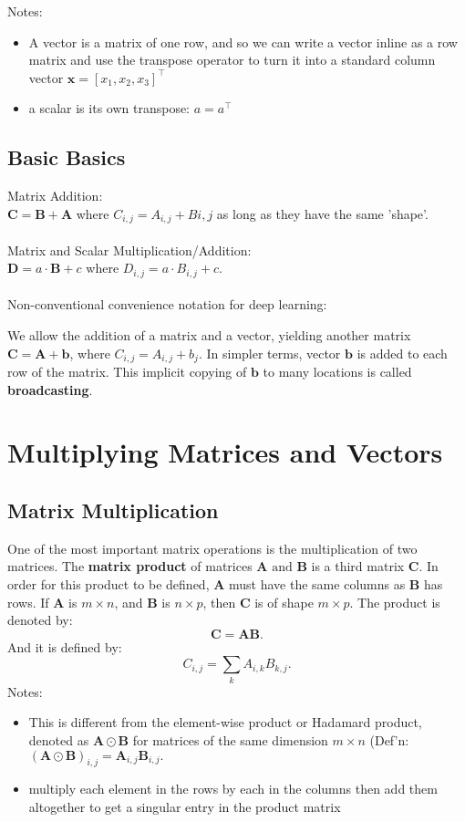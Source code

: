 \documentclass[11pt,twocolumn]{report}
\begin{document}
Notes: 
\begin{itemize}
  \item A vector is a matrix of one row, and so we can write a vector inline as
    a row matrix and use the transpose operator to turn it into a standard
    column vector $\bm{x} = [x_1, x_2, x_3]^\intercal$
  \item a scalar is its own transpose: $a = a^\intercal$
\end{itemize}

\subsection{Basic Basics}
Matrix Addition:\\
$\bm{C} = \bm{B} + \bm{A}$ where $C_{i, j} = A_{i, j} + B{i, j}$ as long as
they have the same 'shape'.\\\\
Matrix and Scalar Multiplication/Addition:\\
$\bm{D} = a \cdot \bm{B} + c$ where $D_{i, j} = a \cdot B_{i, j} + c$.\\\\
Non-conventional convenience notation for deep learning:
\begin{flushleft}
  We allow the addition of a matrix and a vector, yielding another matrix 
  $\bm{C} = \bm{A} + \bm{b}$, where $C_{i, j} = A_{i, j} + b_j$. In simpler
  terms, vector $\bm{b}$ is added to each row of the matrix. This implicit
  copying of $\bm{b}$ to many locations is called \textbf{broadcasting}.
\end{flushleft}

\section{Multiplying Matrices and Vectors}
\subsection{Matrix Multiplication}
One of the most important matrix operations is the multiplication of two matrices. The
\textbf{matrix product} of matrices $\bm{A} \text{ and } \bm{B}$ is a third
matrix $\bm{C}$. In order for this product to be defined, $\bm{A}$ must have
the same columns as $\bm{B}$ has rows. If $\bm{A}$ is $m \times n$, and
$\bm{B}$ is $n \times p$, then $\bm{C}$ is of shape $m \times p$.
The product is denoted by:
\begin{equation}
  \bm{C} = \bm{A}\bm{B}.
\end{equation}
And it is defined by:
\begin{equation}
  C_{i, j} = \sum_k A_{i, k}B_{k, j}.
\end{equation}
Notes:
\begin{itemize}
  \item This is different from the element-wise product or Hadamard product,
    denoted as $\bm{A} \odot \bm{B}$ for matrices of the same dimension $m \times
    n$ (Def'n: $(\bm{A} \odot \bm{B})_{i, j} = \bm{A}_{i, j}\bm{B}_{i, j}.$
  \item multiply each element in the rows by each in the columns then add them
    altogether to get a singular entry in the product matrix
\end{itemize}
\end{document}

